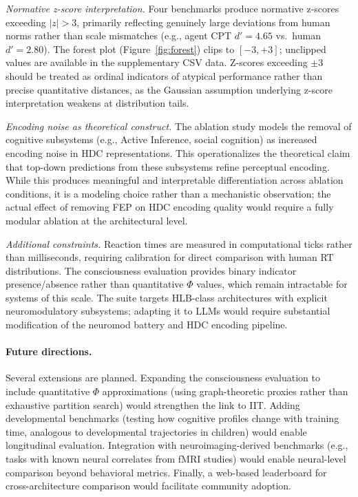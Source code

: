 \documentclass[11pt,letterpaper]{article}
\newcommand{\hlb}{\textsc{HLB}}
\begin{document}
\emph{Normative z-score interpretation.} Four benchmarks produce normative z-scores exceeding $|z| > 3$, primarily reflecting genuinely large deviations from human norms rather than scale mismatches (e.g., agent CPT $d' = 4.65$ vs.\ human $d' = 2.80$). The forest plot (Figure~\ref{fig:forest}) clips to $[-3, +3]$; unclipped values are available in the supplementary CSV data. Z-scores exceeding $\pm 3$ should be treated as ordinal indicators of atypical performance rather than precise quantitative distances, as the Gaussian assumption underlying z-score interpretation weakens at distribution tails.

\emph{Encoding noise as theoretical construct.} The ablation study models the removal of cognitive subsystems (e.g., Active Inference, social cognition) as increased encoding noise in HDC representations. This operationalizes the theoretical claim that top-down predictions from these subsystems refine perceptual encoding. While this produces meaningful and interpretable differentiation across ablation conditions, it is a modeling choice rather than a mechanistic observation; the actual effect of removing FEP on HDC encoding quality would require a fully modular ablation at the architectural level.

\emph{Additional constraints.} Reaction times are measured in computational ticks rather than milliseconds, requiring calibration for direct comparison with human RT distributions. The consciousness evaluation provides binary indicator presence/absence rather than quantitative $\Phi$ values, which remain intractable for systems of this scale. The suite targets \hlb{}-class architectures with explicit neuromodulatory subsystems; adapting it to LLMs would require substantial modification of the neuromod battery and HDC encoding pipeline.

\paragraph{Future directions.} Several extensions are planned. Expanding the consciousness evaluation to include quantitative $\Phi$ approximations (using graph-theoretic proxies rather than exhaustive partition search) would strengthen the link to IIT. Adding developmental benchmarks (testing how cognitive profiles change with training time, analogous to developmental trajectories in children) would enable longitudinal evaluation. Integration with neuroimaging-derived benchmarks (e.g., tasks with known neural correlates from fMRI studies) would enable neural-level comparison beyond behavioral metrics. Finally, a web-based leaderboard for cross-architecture comparison would facilitate community adoption.
\end{document}
